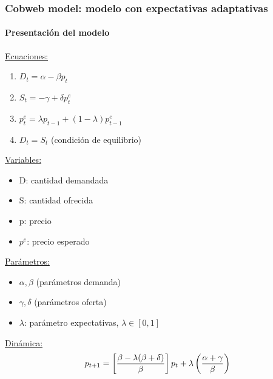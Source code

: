 \documentclass[11pt]{beamer}
\begin{document}
\begin{frame}
	\frametitle{Cobweb model: modelo con expectativas adaptativas}
	\framesubtitle{Presentación del modelo}
	\begin{multicols}{2}
		\underline{Ecuaciones:}
		\begin{enumerate}
			\item $D_t=\alpha-\beta p_t$
			\item $S_t=-\gamma+\delta p^{e}_{t}$
			\item $p^{e}_{t}=\lambda p_{t-1}+(1-\lambda) p^{e}_{t-1}$
			\item $D_t=S_t$ (condición de equilibrio)
		\end{enumerate}
		\underline{Variables:}
		\begin{itemize}
			\item D: cantidad demandada
			\item S: cantidad ofrecida
			\item p: precio
			\item $p^{e}$: precio esperado
		\end{itemize}
		\vspace{1cm}
		\underline{Parámetros: }
		\begin{itemize}
			\item $\alpha, \beta$ (parámetros demanda)
			\item $\gamma, \delta$ (parámetros oferta)
			\item $\lambda$: parámetro expectativas, $\lambda \in [0,1]$
		\end{itemize}
		\underline{Dinámica:}
		\begin{equation}
\small		p_{t+1}=\left[ \dfrac{\beta-\lambda(\beta+\delta)}{\beta}\right] p_t+\lambda\left( \dfrac{\alpha+\gamma}{\beta}\right)
		\end{equation}	
	\end{multicols}
\end{frame}
\end{document}

